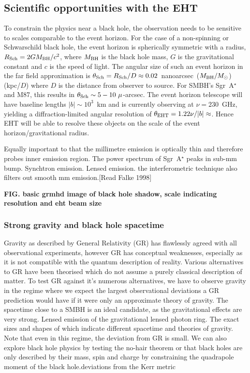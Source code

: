 \subsection{Scientific opportunities with the EHT}
To constrain the physics near a black hole, the observation needs to be sensitive to scales comparable to the event horizon. For the case of a non-spinning or Schwarschild black hole, the event horizon is spherically symmetric with a radius, $R_{\rm Sch} = 2 G M_{\rm BH} /c^2$,  where $M_{\rm BH}$ is the black hole mass, $G$ is the gravitational constant and $c$ is the speed of light. The angular size of such an event horizon in the far field approximation is $\theta_{\rm Sch} = R_{\rm Sch} / D \approx 0.02$~nanoarcsec~($M_{\rm BH}/M_\odot$)(kpc/$D$) where $D$ is the distance from observer to source. For SMBH's Sgr~A$^\star$ and M87, this results in $\theta_{\rm Sch} \sim 5-10\ \mu$-arcsec. The event horizon telescope will have baseline lengths $|b| \sim 10^3$~km and is currently observing at $\nu =230$~GHz, yielding a diffraction-limited angular resolution of $\theta_{\rm EHT} = 1.22 \nu/ |b| \approx $. Hence EHT will be able to resolve these objects on the scale of the event horizon/gravitational radius. 

Equally important to  that the millimetre emission is optically thin and therefore probes inner emission region. The power spectrum of Sgr~A$^\star$ peaks in sub-mm bump. Synchtron emission. Lensed emission. the interferometric technique also filters out smooth mm emission.[Read Falke 1998]

{\bf FIG. basic grmhd image of black hole shadow, scale indicating resolution and eht beam size}\\


\subsubsection{Strong gravity and black hole spacetime}
Gravity as described by General Relativity (GR) has flawlessly agreed with all observational experiments, however GR has conceptual weaknesses, especially as it is not compatible with the quantum description of reality. Various alternatives to GR have been theorised which do not assume a purely classical description of matter. To test GR against it's numerous alternatives, we have to observe gravity in the regime where we expect the largest observational deviations a GR prediction would have if it were only an approximate theory of gravity.  The spacetime close to a SMBH is an ideal candidate, as the gravitational effects are very strong. Lensed emission of the gravitational lensed photon ring.  The exact sizes and shapes of which indicate different spacetime and theories of gravity. Note that even in this regime, the deviation from GR is small. We can also explore black hole physics by testing the no-hair theorem or that black holes are only described by their mass, spin and charge by constraining the quadrapole moment of the black hole.deviations
from the Kerr metric

